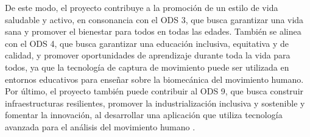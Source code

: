 De este modo, el proyecto contribuye a la promoción de un estilo de vida saludable y activo, en consonancia con el ODS 3, que busca garantizar una vida sana y promover el bienestar para todos en todas las edades. También se alinea con el ODS 4, que busca garantizar una educación inclusiva, equitativa y de calidad, y promover oportunidades de aprendizaje durante toda la vida para todos, ya que la tecnología de captura de movimiento puede ser utilizada en entornos educativos para enseñar sobre la biomecánica del movimiento humano. Por último, el proyecto también puede contribuir al ODS 9, que busca construir infraestructuras resilientes, promover la industrialización inclusiva y sostenible y fomentar la innovación, al desarrollar una aplicación que utiliza tecnología avanzada para el análisis del movimiento humano \autocite{ODSObjetivosDesarrollo}.


